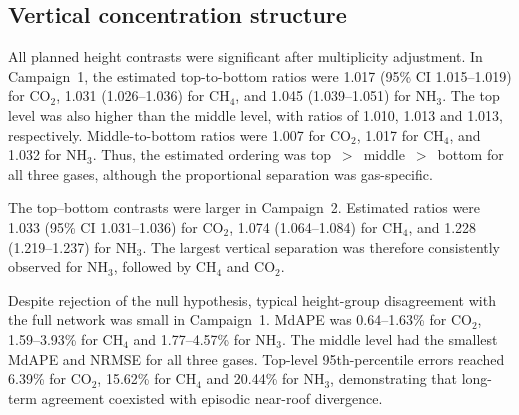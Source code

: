 \documentclass[12pt,a4paper]{article}
\begin{document}
\subsection{Vertical concentration structure}

All planned height contrasts were significant after multiplicity adjustment. In Campaign~1, the estimated top-to-bottom ratios were 1.017 (95\% CI 1.015--1.019) for \(\mathrm{CO_2}\), 1.031 (1.026--1.036) for \(\mathrm{CH_4}\), and 1.045 (1.039--1.051) for \(\mathrm{NH_3}\). The top level was also higher than the middle level, with ratios of 1.010, 1.013 and 1.013, respectively. Middle-to-bottom ratios were 1.007 for \(\mathrm{CO_2}\), 1.017 for \(\mathrm{CH_4}\), and 1.032 for \(\mathrm{NH_3}\). Thus, the estimated ordering was top~\(>\)~middle~\(>\)~bottom for all three gases, although the proportional separation was gas-specific.

The top--bottom contrasts were larger in Campaign~2. Estimated ratios were 1.033 (95\% CI 1.031--1.036) for \(\mathrm{CO_2}\), 1.074 (1.064--1.084) for \(\mathrm{CH_4}\), and 1.228 (1.219--1.237) for \(\mathrm{NH_3}\). The largest vertical separation was therefore consistently observed for \(\mathrm{NH_3}\), followed by \(\mathrm{CH_4}\) and \(\mathrm{CO_2}\).

Despite rejection of the null hypothesis, typical height-group disagreement with the full network was small in Campaign~1. MdAPE was 0.64--1.63\% for \(\mathrm{CO_2}\), 1.59--3.93\% for \(\mathrm{CH_4}\) and 1.77--4.57\% for \(\mathrm{NH_3}\). The middle level had the smallest MdAPE and NRMSE for all three gases. Top-level 95th-percentile errors reached 6.39\% for \(\mathrm{CO_2}\), 15.62\% for \(\mathrm{CH_4}\) and 20.44\% for \(\mathrm{NH_3}\), demonstrating that long-term agreement coexisted with episodic near-roof divergence.
\end{document}
